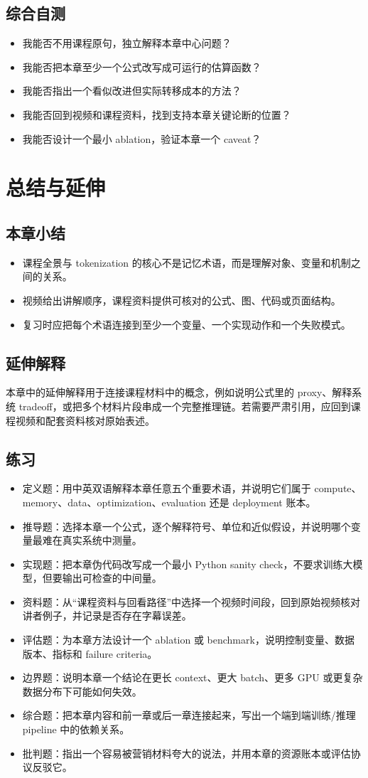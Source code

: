 \documentclass[a4paper]{article}
\begin{document}
\subsection{综合自测}
\begin{itemize}
\item 我能否不用课程原句，独立解释本章中心问题？
\item 我能否把本章至少一个公式改写成可运行的估算函数？
\item 我能否指出一个看似改进但实际转移成本的方法？
\item 我能否回到视频和课程资料，找到支持本章关键论断的位置？
\item 我能否设计一个最小 ablation，验证本章一个 caveat？
\end{itemize}
\section{总结与延伸}
\subsection{本章小结}
\begin{itemize}
\item 课程全景与 tokenization 的核心不是记忆术语，而是理解对象、变量和机制之间的关系。
\item 视频给出讲解顺序，课程资料提供可核对的公式、图、代码或页面结构。
\item 复习时应把每个术语连接到至少一个变量、一个实现动作和一个失败模式。
\end{itemize}
\subsection{延伸解释}
本章中的延伸解释用于连接课程材料中的概念，例如说明公式里的 proxy、解释系统 tradeoff，或把多个材料片段串成一个完整推理链。若需要严肃引用，应回到课程视频和配套资料核对原始表述。
\subsection{练习}
\begin{itemize}
\item 定义题：用中英双语解释本章任意五个重要术语，并说明它们属于 compute、memory、data、optimization、evaluation 还是 deployment 账本。
\item 推导题：选择本章一个公式，逐个解释符号、单位和近似假设，并说明哪个变量最难在真实系统中测量。
\item 实现题：把本章伪代码改写成一个最小 Python sanity check，不要求训练大模型，但要输出可检查的中间量。
\item 资料题：从“课程资料与回看路径”中选择一个视频时间段，回到原始视频核对讲者例子，并记录是否存在字幕误差。
\item 评估题：为本章方法设计一个 ablation 或 benchmark，说明控制变量、数据版本、指标和 failure criteria。
\item 边界题：说明本章一个结论在更长 context、更大 batch、更多 GPU 或更复杂数据分布下可能如何失效。
\item 综合题：把本章内容和前一章或后一章连接起来，写出一个端到端训练/推理 pipeline 中的依赖关系。
\item 批判题：指出一个容易被营销材料夸大的说法，并用本章的资源账本或评估协议反驳它。
\end{itemize}
\end{document}
